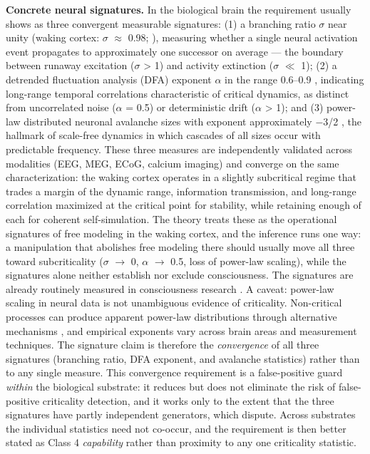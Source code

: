 \documentclass[12pt]{article}
\begin{document}
\textbf{Concrete neural signatures.} In the biological brain the requirement usually shows as three convergent measurable signatures: (1) a branching ratio $\sigma$ near unity (waking cortex: $\sigma$ $\approx$ 0.98; \citealp{Priesemann2014}), measuring whether a single neural activation event propagates to approximately one successor on average --- the boundary between runaway excitation ($\sigma$ > 1) and activity extinction ($\sigma$ $\ll$ 1); (2) a detrended fluctuation analysis (DFA) exponent $\alpha$ in the range 0.6--0.9 \citep{Hardstone2012}, indicating long-range temporal correlations characteristic of critical dynamics, as distinct from uncorrelated noise ($\alpha$ = 0.5) or deterministic drift ($\alpha$ > 1); and (3) power-law distributed neuronal avalanche sizes with exponent approximately $-$3/2 \citep{Beggs2003}, the hallmark of scale-free dynamics in which cascades of all sizes occur with predictable frequency. These three measures are independently validated across modalities (EEG, MEG, ECoG, calcium imaging) and converge on the same characterization: the waking cortex operates in a slightly subcritical regime that trades a margin of the dynamic range, information transmission, and long-range correlation maximized at the critical point for stability, while retaining enough of each for coherent self-simulation. The theory treats these as the operational signatures of free modeling in the waking cortex, and the inference runs one way: a manipulation that abolishes free modeling there should usually move all three toward subcriticality ($\sigma$ $\rightarrow$ 0, $\alpha$ $\rightarrow$ 0.5, loss of power-law scaling), while the signatures alone neither establish nor exclude consciousness. The signatures are already routinely measured in consciousness research \citep{Priesemann2014,Maschke2024,AlgomShriki2026}. A caveat: power-law scaling in neural data is not unambiguous evidence of criticality. Non-critical processes can produce apparent power-law distributions through alternative mechanisms \citep{TouboulDestexhe2017}, and empirical exponents vary across brain areas and measurement techniques. The signature claim is therefore the \emph{convergence} of all three signatures (branching ratio, DFA exponent, and avalanche statistics) rather than to any single measure. This convergence requirement is a false-positive guard \emph{within} the biological substrate: it reduces but does not eliminate the risk of false-positive criticality detection, and it works only to the extent that the three signatures have partly independent generators, which \citet{Sipling2026} dispute. Across substrates the individual statistics need not co-occur, and the requirement is then better stated as Class 4 \emph{capability} rather than proximity to any one criticality statistic.
\end{document}
